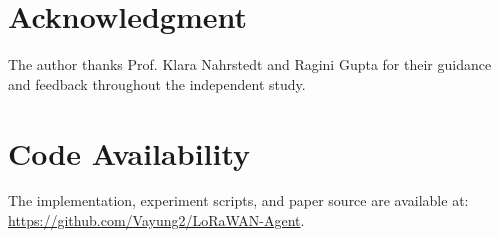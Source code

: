 \documentclass[10pt, twocolumn, letterpaper]{article}
\begin{document}
\section*{Acknowledgment}

The author thanks Prof. Klara Nahrstedt and Ragini Gupta for their guidance and feedback throughout the independent study.

\section*{Code Availability}

The implementation, experiment scripts, and paper source are available at: \url{https://github.com/Vayung2/LoRaWAN-Agent}.

















\end{document}
